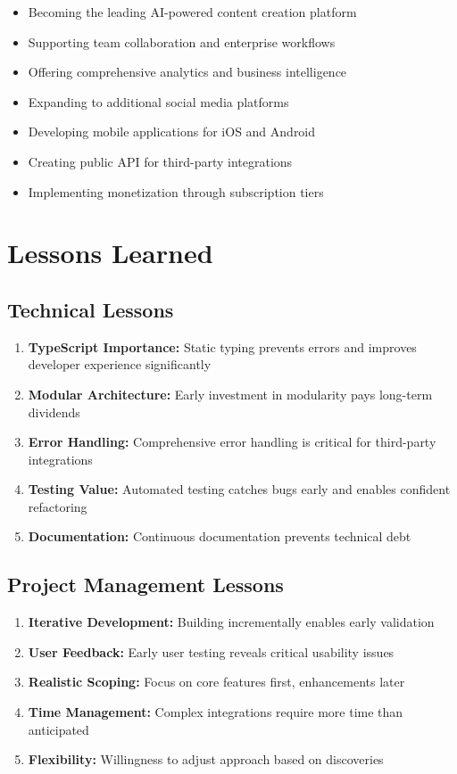 \begin{itemize}
    \item Becoming the leading AI-powered content creation platform
    \item Supporting team collaboration and enterprise workflows
    \item Offering comprehensive analytics and business intelligence
    \item Expanding to additional social media platforms
    \item Developing mobile applications for iOS and Android
    \item Creating public API for third-party integrations
    \item Implementing monetization through subscription tiers
\end{itemize}

\section{Lessons Learned}

\subsection{Technical Lessons}

\begin{enumerate}
    \item \textbf{TypeScript Importance:} Static typing prevents errors and improves developer experience significantly
    \item \textbf{Modular Architecture:} Early investment in modularity pays long-term dividends
    \item \textbf{Error Handling:} Comprehensive error handling is critical for third-party integrations
    \item \textbf{Testing Value:} Automated testing catches bugs early and enables confident refactoring
    \item \textbf{Documentation:} Continuous documentation prevents technical debt
\end{enumerate}

\subsection{Project Management Lessons}

\begin{enumerate}
    \item \textbf{Iterative Development:} Building incrementally enables early validation
    \item \textbf{User Feedback:} Early user testing reveals critical usability issues
    \item \textbf{Realistic Scoping:} Focus on core features first, enhancements later
    \item \textbf{Time Management:} Complex integrations require more time than anticipated
    \item \textbf{Flexibility:} Willingness to adjust approach based on discoveries
\end{enumerate}

